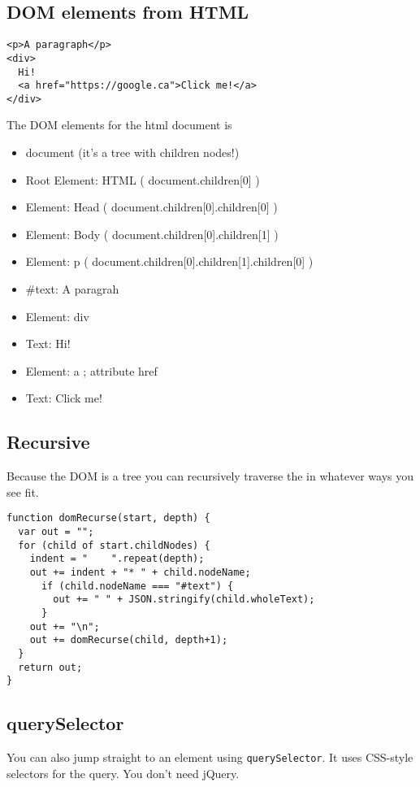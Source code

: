 \documentclass[../CMPUT-404-Notes.tex]{subfiles}
\begin{document}
\subsection{DOM elements from HTML}
\begin{verbatim}
<p>A paragraph</p>
<div>
  Hi!
  <a href="https://google.ca">Click me!</a>
</div>
\end{verbatim}
The DOM elements for the html document is 
\begin{itemize}
    \item document (it's a tree with children nodes!)
    \item Root Element: HTML ( document.children[0] )
    \item Element: Head ( document.children[0].children[0] )
    \item Element: Body ( document.children[0].children[1] )
    \item Element: p ( document.children[0].children[1].children[0] )
    \item \#text: A paragrah
    \item Element: div
    \item Text: Hi!
    \item Element: a ; attribute href
    \item Text: Click me!
\end{itemize}


\subsection{Recursive}
Because the DOM is a tree you can recursively traverse the in whatever ways you see fit.

\begin{verbatim}
function domRecurse(start, depth) {
  var out = "";
  for (child of start.childNodes) {
    indent = "    ".repeat(depth);
    out += indent + "* " + child.nodeName;
      if (child.nodeName === "#text") {
        out += " " + JSON.stringify(child.wholeText);
      }
    out += "\n";
    out += domRecurse(child, depth+1);
  }
  return out;
}
\end{verbatim}

\subsection{querySelector}
You can also jump straight to an element using \texttt{querySelector}. It uses CSS-style selectors for the query. You don't need jQuery.
\end{document}

